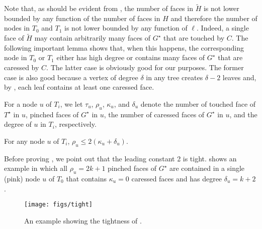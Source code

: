 \documentclass{patmorin}
\newcommand{\dual}[1]{{#1}^\star}
\begin{document}
Note that, as should be evident from , the number of faces in $\tilde{H}$ is not lower bounded by any function of the number of faces in $H$ and therefore the number of nodes in $T_0$ and $T_1$ is not lower bounded by any function of $\ell$.  Indeed, a single face of $\tilde{H}$ may contain arbitrarily many faces of $\dual{G}$ that are touched by $C$.  The following important lemma shows that, when this happens, the corresponding node in $T_0$ or $T_1$ either has high degree or contains many faces of $\dual{G}$ that are caressed by $C$.  The latter case is obviously good for our purposes. The former case is also good because a vertex of degree $\delta$ in any tree creates $\delta-2$ leaves and, by , each leaf contains at least one caressed face.

For a node $u$ of $T_i$, we let $\tau_u$, $\rho_u$, $\kappa_u$, and $\delta_u$ denote the number of touched face of $\dual{T}$ in $u$, pinched faces of $\dual{G}$ in $u$, the number of caressed faces of $\dual{G}$ in $u$, and the degree of $u$ in $T_i$, respectively.

\begin{lem}
   For any node $u$ of $T_i$, $\rho_u \le 2(\kappa_u+\delta_u)$.
\end{lem}

Before proving , we point out that
the leading constant 2 is tight.  shows an example in
which all $\rho_u=2k+1$ pinched faces of $\dual{G}$ are contained in a
single (pink) node $u$ of $T_0$ that contains $\kappa_u=0$ caressed faces and
has degree $\delta_u=k+2$.

\begin{figure}
  \begin{center}
    \texttt{[image: figs/tight]}
  \end{center}
  \caption{An example showing the tightness of .}
\end{figure}

\end{document}

